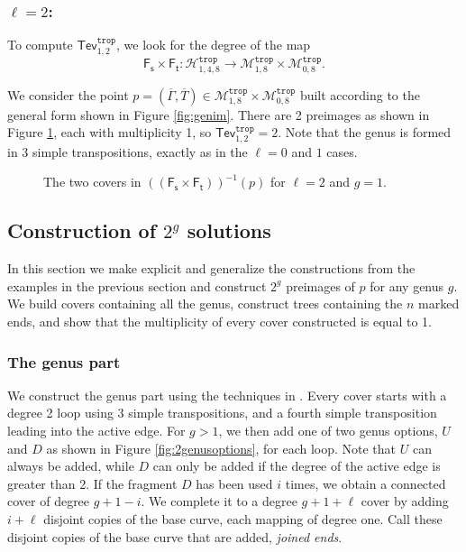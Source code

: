\documentclass[11pt,reqno]{amsart}
\newcommand{\inputTikZ}[2]{%
     \resizebox{#1}{!}{}}
\theoremstyle{definition}
\newcommand\trop{{\mathtt{trop}}}
\newcommand\Mgn[1]{\mathcal M_{#1}}
\newcommand\Hur[1]{\mathcal H_{#1}}
\newcommand{\Ft}{\mathsf{F_t}}
\newcommand{\Fs}{\mathsf{F_s}}
\newcommand{\Tev}{{\mathsf{Tev}}}
\begin{document}

\subsubsection{$\ell=2$:} 
To compute $\Tev_{1,2}^\trop$, we look for the degree of the map
\begin{equation}
    \Fs\times \Ft: \Hur{1,4,8}^\trop \to \Mgn{1,8}^\trop \times \Mgn{0,8}^\trop.
\end{equation}


We consider the point $p=(\overline{\Gamma},\overline{T})\in \Mgn{1,8}^\trop \times \Mgn{0,8}^\trop$ built according to the general form shown in Figure \ref{fig:genim}. There are 2 preimages as shown in Figure \ref{fig:l=2g=1}, each with multiplicity 1, so $\Tev_{1,2}^\trop=2$. Note that the genus is formed in 3 simple transpositions, exactly as in the $\ell=0$ and $1$ cases.

\begin{figure}[tb]
    \centering
    \inputTikZ{\textwidth}{Figures/l=2g=1}
    \caption{The two covers in $((\Fs\times\Ft))^{-1}(p)$ for $\ell=2$ and $g=1$.}
    \label{fig:l=2g=1}
\end{figure}

\subsection{Construction of $2^g$ solutions}
In this section we make explicit and generalize the constructions from the examples in the previous section and construct $2^g$ preimages of $p$ for any genus $g$. We build covers containing all the genus, construct trees containing the $n$ marked ends, and show that the multiplicity of every cover constructed is equal to 1. 

\subsubsection*{The genus part}
We construct the genus part using the techniques in \cite{troptev}. Every cover starts with a degree 2 loop using 3 simple transpositions, and a fourth simple transposition leading into the active edge. For $g>1$, we then add one of two genus options, $U$ and $D$ as shown in Figure \ref{fig:2genusoptions}, for each loop. Note that $U$ can always be added, while $D$ can only be added if the degree of the active edge is greater than 2. If the fragment $D$ has been used $i$ times, we obtain a connected cover of degree $g+1-i$. We complete it to a degree $g+1+\ell$ cover by adding $i+\ell$ disjoint copies of the base curve, each mapping of degree one. Call these disjoint copies of the base curve that are added, \textit{joined ends}.
\end{document}
